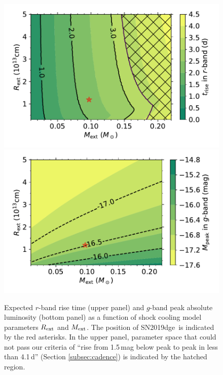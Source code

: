 \documentclass[twocolumn]{aastex63}
\newcommand{\name}{SN2019dge}
\begin{document}
\begin{figure}[htbp!]
	\centering
	\includegraphics[width=\columnwidth]{figures/cooling_trise.pdf}
	\includegraphics[width=\columnwidth]{figures/cooling_Mpeak.pdf}
	\caption{Expected $r$-band rise time (upper panel) and $g$-band peak absolute luminosity (bottom 
	panel) as a function of shock cooling model parameters $R_{\rm ext}$ and $M_{\rm ext}$. The 
	position of \name\	is 	indicated by the {\color{red}red} asterisks. In the upper panel, parameter 
	space that could not pass our criteria of ``rise from 1.5\,mag below peak to peak in less than 4.1\,d'' 
	(Section \ref{subsec:cadence}) is indicated by the hatched region. \label{fig:cooling}}
\end{figure}
\end{document}
